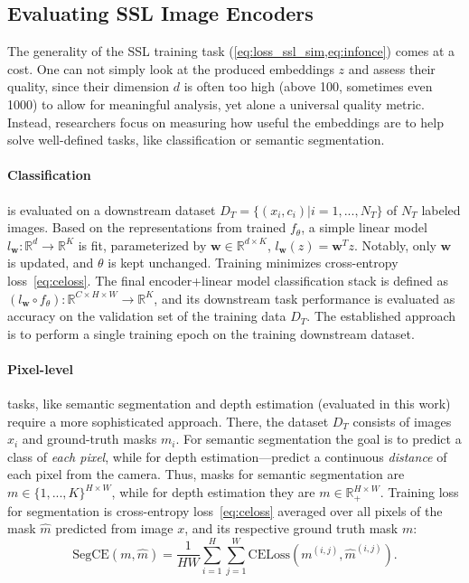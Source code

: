 \subsection{Evaluating SSL Image Encoders}\label{sec:eval_ssl}
The generality of the SSL training task (\cref{eq:loss_ssl_sim,eq:infonce}) comes at a cost. One can not simply look at the produced embeddings $z$ and assess their quality, since their dimension $d$ is often too high (above 100, sometimes even 1000) to allow for meaningful analysis, yet alone a universal quality metric. Instead, researchers focus on measuring how useful the embeddings are to help solve well-defined tasks, like classification or semantic segmentation. 

\paragraph{Classification} is evaluated on a downstream dataset $D_T=\{(x_i,c_i)|i=1,...,N_T\}$ of $N_T$ labeled images. Based on the representations from trained $f_\theta$, a simple linear model $l_\mathbf{w}: \mathbb{R}^d \rightarrow \mathbb{R}^K$ is fit, parameterized by $\mathbf{w}\in \mathbb{R}^{d\times K}$, $l_\mathbf{w}(z)=\mathbf{w}^Tz$. Notably, only $\mathbf{w}$ is updated, and $\theta$ is kept unchanged. Training minimizes cross-entropy loss~\cref{eq:celoss}.
The final encoder+linear model classification stack is defined as $(l_\mathbf{w}\circ f_\theta): \mathbb{R}^{C\times H\times W} \rightarrow \mathbb{R}^K$, and its downstream task performance is evaluated as accuracy on the validation set of the training data $D_T$. The established approach is to perform a single training epoch on the training downstream dataset.

\paragraph{Pixel-level} tasks, like semantic segmentation and depth estimation (evaluated in this work) require a more sophisticated approach. There, the dataset $D_T$ consists of images $x_i$ and ground-truth masks $m_i$. For semantic segmentation the goal is to predict a class of \textit{each pixel}, while for depth estimation---predict a continuous \textit{distance} of each pixel from the camera. Thus, masks for semantic segmentation are $m\in\{1,...,K\}^{H\times W}$, while for depth estimation they are $m\in\mathbb{R}_+^{H\times W}$. Training loss for segmentation is cross-entropy loss~\cref{eq:celoss} averaged over all pixels of the mask $\hat{m}$ predicted from image $x$, and its respective ground truth mask $m$:
\begin{equation}
    \text{SegCE}(m,\hat{m})=\frac{1}{HW}\sum_{i=1}^{H}\sum_{j=1}^{W}\text{CELoss}(m^{(i,j)},\hat{m}^{(i,j)})\text{.}
    \label{eq:seg_celoss}
\end{equation}


